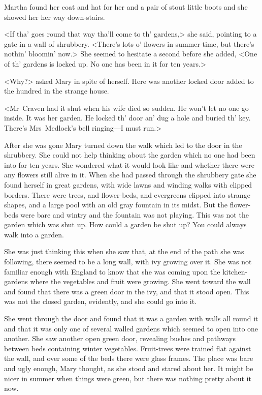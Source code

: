 Martha found her coat and hat for her and a pair of stout little boots and she showed her her way down-stairs.

<If tha' goes round that way tha'll come to th' gardens,> she said, pointing to a gate in a wall of shrubbery. <There's lots o' flowers in summer-time, but there's nothin' bloomin' now.> She seemed to hesitate a second before she added, <One of th' gardens is locked up. No one has been in it for ten years.>

<Why?> asked Mary in spite of herself. Here was another locked door added to the hundred in the strange house.

<Mr~Craven had it shut when his wife died so sudden. He won't let no one go inside. It was her garden. He locked th' door an' dug a hole and buried th' key. There's Mrs~Medlock's bell ringing—I must run.>

After she was gone Mary turned down the walk which led to the door in the shrubbery. She could not help thinking about the garden which no one had been into for ten years. She wondered what it would look like and whether there were any flowers still alive in it. When she had passed through the shrubbery gate she found herself in great gardens, with wide lawns and winding walks with clipped borders. There were trees, and flower-beds, and evergreens clipped into strange shapes, and a large pool with an old gray fountain in its midst. But the flower-beds were bare and wintry and the fountain was not playing. This was not the garden which was shut up. How could a garden be shut up? You could always walk into a garden.

She was just thinking this when she saw that, at the end of the path she was following, there seemed to be a long wall, with ivy growing over it. She was not familiar enough with England to know that she was coming upon the kitchen-gardens where the vegetables and fruit were growing. She went toward the wall and found that there was a green door in the ivy, and that it stood open. This was not the closed garden, evidently, and she could go into it.

She went through the door and found that it was a garden with walls all round it and that it was only one of several walled gardens which seemed to open into one another. She saw another open green door, revealing bushes and pathways between beds containing winter vegetables. Fruit-trees were trained flat against the wall, and over some of the beds there were glass frames. The place was bare and ugly enough, Mary thought, as she stood and stared about her. It might be nicer in summer when things were green, but there was nothing pretty about it now.

